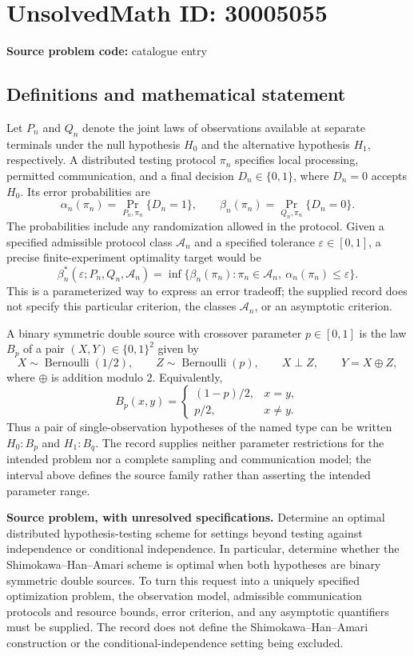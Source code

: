 \documentclass[11pt]{article}
\begin{document}
\section*{UnsolvedMath ID: 30005055}
\textbf{Source problem code:} catalogue entry
\subsection{Definitions and mathematical statement}
Let \(P_n\) and \(Q_n\) denote the joint laws of observations available at separate terminals under the null hypothesis \(H_0\) and the alternative hypothesis \(H_1\), respectively. A distributed testing protocol \(\pi_n\) specifies local processing, permitted communication, and a final decision \(D_n\in\{0,1\}\), where \(D_n=0\) accepts \(H_0\). Its error probabilities are
\[
\alpha_n(\pi_n)=\Pr_{P_n,\pi_n}\{D_n=1\},\qquad
\beta_n(\pi_n)=\Pr_{Q_n,\pi_n}\{D_n=0\}.
\]
The probabilities include any randomization allowed in the protocol. Given a specified admissible protocol class \(\mathcal A_n\) and a specified tolerance \(\varepsilon\in[0,1]\), a precise finite-experiment optimality target would be
\[
\beta_n^*(\varepsilon;P_n,Q_n,\mathcal A_n)
=\inf\bigl\{\beta_n(\pi_n):\pi_n\in\mathcal A_n,\ \alpha_n(\pi_n)\leq\varepsilon\bigr\}.
\]
This is a parameterized way to express an error tradeoff; the supplied record does not specify this particular criterion, the classes \(\mathcal A_n\), or an asymptotic criterion.

A binary symmetric double source with crossover parameter \(p\in[0,1]\) is the law \(B_p\) of a pair \((X,Y)\in\{0,1\}^2\) given by
\[
X\sim\operatorname{Bernoulli}(1/2),\qquad
Z\sim\operatorname{Bernoulli}(p),\qquad
X\perp Z,\qquad Y=X\oplus Z,
\]
where \(\oplus\) is addition modulo \(2\). Equivalently,
\[
B_p(x,y)=
\begin{cases}
(1-p)/2,&x=y,\\
p/2,&x\ne y.
\end{cases}
\]
Thus a pair of single-observation hypotheses of the named type can be written \(H_0:B_p\) and \(H_1:B_q\). The record supplies neither parameter restrictions for the intended problem nor a complete sampling and communication model; the interval above defines the source family rather than asserting the intended parameter range.

\textbf{Source problem, with unresolved specifications.} Determine an optimal distributed hypothesis-testing scheme for settings beyond testing against independence or conditional independence. In particular, determine whether the Shimokawa--Han--Amari scheme is optimal when both hypotheses are binary symmetric double sources. To turn this request into a uniquely specified optimization problem, the observation model, admissible communication protocols and resource bounds, error criterion, and any asymptotic quantifiers must be supplied. The record does not define the Shimokawa--Han--Amari construction or the conditional-independence setting being excluded.
\end{document}
